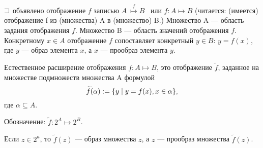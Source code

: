 \documentclass{article}
\begin{document}


$\sqsupset$ объявлено отображение $f$ записью $A \ \overset{f}{\mapsto} B$ \ или $f: A\mapsto B$ (читается: (имеется) отображение f из (множества) A в (множество) B.) Множество A --- область задания отображения $f$. Множество
B --- область значений отображения $f$. Конкретному $x \in A$ отображение $f$ сопоставляет конкретный $y \in B$: $y=f(x)$, где $y$ --- образ элемента $x$, а $x$ --- прообраз элемента $y$.


Естественное расширение отображения $f: A\mapsto B$, это отображение $\widetilde{f}$, заданное на множестве подмножеств множества A формулой $$\widetilde{f}(\alpha):=\{y\;|\;y=f(x), x \in \alpha\},$$ где $\alpha \subseteq A$.

Обозначение: $\widetilde{f}: 2^A \mapsto 2^B$.

Если $z \in 2^a$, то $\widetilde{f}(z)$ --- образ множества $z$, а $z$ --- прообраз множества $\widetilde{f}(z)$.
\end{document}
